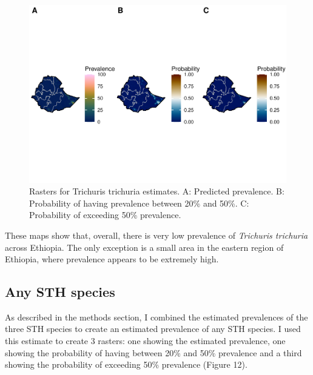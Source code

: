 \documentclass[
]{article}
\begin{document}
\begin{figure}
\centering
\includegraphics{write_up_files/figure-latex/TT.prediction.rasters-1.pdf}
\caption{Rasters for Trichuris trichuria estimates. A: Predicted
prevalence. B: Probability of having prevalence between 20\% and 50\%.
C: Probability of exceeding 50\% prevalence.}
\end{figure}

These maps show that, overall, there is very low prevalence of
\emph{Trichuris trichuria} across Ethiopia. The only exception is a
small area in the eastern region of Ethiopia, where prevalence appears
to be extremely high.

\hypertarget{any-sth-species}{%
\subsection{Any STH species}\label{any-sth-species}}

As described in the methods section, I combined the estimated
prevalences of the three STH species to create an estimated prevalence
of any STH species. I used this estimate to create 3 rasters: one
showing the estimated prevalence, one showing the probability of having
between 20\% and 50\% prevalence and a third showing the probability of
exceeding 50\% prevalence (Figure 12).
\end{document}
